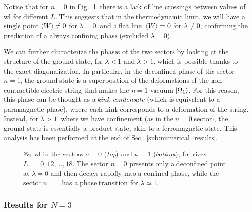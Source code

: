 Notice that for $n=0$ in Fig.~\ref{fig:z2_wilson}, there is a lack of line crossings between values of \ac{wl} for different $L$.
This suggests that in the thermodynamic limit, we will have a single point $\ev{W} \neq 0$ for $\lambda = 0$, and a flat line $\ev*{W} = 0$ for $\lambda \neq 0$, confirming the prediction of a always confining phase (excluded $\lambda = 0$).

We can further characterize the phases of the two sectors by looking at the structure of the ground state, for $\lambda<1$ and $\lambda>1$, which is possible thanks to the exact diagonalization.
In particular, in the deconfined phase of the sector $n=1$, the ground state is a superposition of the deformations of the non-contractible electric string that makes the $n=1$ vacuum $\ket{\Omega_1}$.
For this reason, this phase can be thought as a \emph{kink condensate} \cite{fradkin1978order} (which is equivalent to a paramagnetic phase), where each kink corresponds to a deformation of the string.
Instead, for $\lambda > 1$, where we have confinement (as in the $n=0$ sector), the ground state is essentially a product state, akin to a ferromagnetic state.
This analysis has been performed at the end of Sec.~\ref{sub:numerical_results}.

\begin{figure}[t]
    \centering
    
    \vspace*{-10pt}
    \caption[\ac{wl}s for the $\Z_2$ ladder \ac{lgt}]{$\Z_2$ \ac{wl} in the sectors $n=0$ (\emph{top}) and $n=1$ (\emph{bottom}), for sizes $L=10,12, \dots,18$.
    The sector $n=0$ presents only a deconfined point at $\lambda=0$ and then decays rapidly into a confined phase, while the sector $n=1$ has a phase transition for $\lambda \simeq 1$.
    }
    \label{fig:z2_wilson}
\end{figure}



\subsubsection*{Results for \texorpdfstring{$N=3$}{N=3}}%


